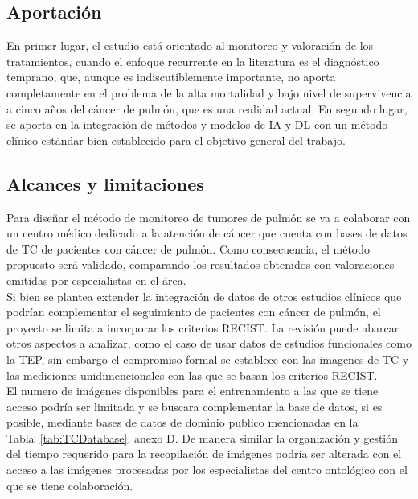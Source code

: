 \documentclass[11pt,a4paper,openany]{article}
\begin{document}
    

    \subsection{Aportación}

     En primer lugar, el estudio está orientado al monitoreo y valoración de los tratamientos, cuando el enfoque recurrente en la literatura es el diagnóstico temprano, que, aunque es indiscutiblemente importante, no aporta completamente en el problema de la alta mortalidad y bajo nivel de supervivencia a cinco años del cáncer de pulmón, que es una realidad actual. En segundo lugar, se aporta en la integración de métodos y modelos de IA y DL con un método clínico estándar bien establecido para el objetivo general del trabajo.

    \subsection{Alcances y limitaciones}
    Para diseñar el método de monitoreo de tumores de pulmón se va a colaborar con un centro médico dedicado a la atención de cáncer que cuenta con bases de datos de TC de pacientes con cáncer de pulmón. Como consecuencia, el método propuesto será validado, comparando los resultados obtenidos con valoraciones emitidas por especialistas en el área.\\
    
    Si bien se plantea extender la integración de datos de otros estudios clínicos que podrían complementar el seguimiento de pacientes con cáncer de pulmón, el proyecto se limita a incorporar los criterios RECIST. La revisión puede abarcar otros aspectos a analizar, como el caso de usar datos de estudios funcionales como la TEP, sin embargo el compromiso formal se establece con las imagenes de TC y las mediciones unidimencionales con las que se basan los criterios RECIST.\\
    
    El numero de imágenes disponibles para el entrenamiento a las que se tiene acceso podría ser limitada y se buscara complementar la base de datos, si es posible, mediante bases de datos de dominio publico mencionadas en la Tabla~\ref{tab:TCDatabase}, anexo D. De manera similar la organización y gestión del tiempo requerido para la recopilación de imágenes podría ser alterada con el acceso a las imágenes procesadas por los especialistas del centro ontológico con el que se tiene colaboración.
    
    
\end{document}
